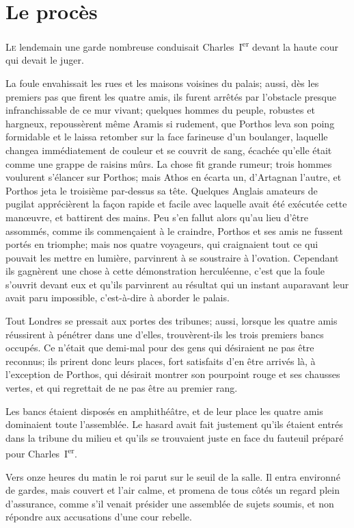 \chapter{Le procès}

\lettrine{L}{e} lendemain une garde nombreuse conduisait Charles~I\textsuperscript{er} devant la haute cour qui devait le juger.

\zz
La foule envahissait les rues et les maisons voisines du palais; aussi, dès les premiers pas que firent les quatre amis, ils furent arrêtés par l'obstacle presque infranchissable de ce mur vivant; quelques hommes du peuple, robustes et hargneux, repoussèrent même Aramis si rudement, que Porthos leva son poing formidable et le laissa retomber sur la face farineuse d'un boulanger, laquelle changea immédiatement de couleur et se couvrit de sang, écachée qu'elle était comme une grappe de raisins mûrs. La chose fit grande rumeur; trois hommes voulurent s'élancer sur Porthos; mais Athos en écarta un, d'Artagnan l'autre, et Porthos jeta le troisième par-dessus sa tête. Quelques Anglais amateurs de pugilat apprécièrent la façon rapide et facile avec laquelle avait été exécutée cette manœuvre, et battirent des mains. Peu s'en fallut alors qu'au lieu d'être assommés, comme ils commençaient à le craindre, Porthos et ses amis ne fussent portés en triomphe; mais nos quatre voyageurs, qui craignaient tout ce qui pouvait les mettre en lumière, parvinrent à se soustraire à l'ovation. Cependant ils gagnèrent une chose à cette démonstration herculéenne, c'est que la foule s'ouvrit devant eux et qu'ils parvinrent au résultat qui un instant auparavant leur avait paru impossible, c'est-à-dire à aborder le palais.

Tout Londres se pressait aux portes des tribunes; aussi, lorsque les quatre amis réussirent à pénétrer dans une d'elles, trouvèrent-ils les trois premiers bancs occupés. Ce n'était que demi-mal pour des gens qui désiraient ne pas être reconnus; ils prirent donc leurs places, fort satisfaits d'en être arrivés là, à l'exception de Porthos, qui désirait montrer son pourpoint rouge et ses chausses vertes, et qui regrettait de ne pas être au premier rang.

Les bancs étaient disposés en amphithéâtre, et de leur place les quatre amis dominaient toute l'assemblée. Le hasard avait fait justement qu'ils étaient entrés dans la tribune du milieu et qu'ils se trouvaient juste en face du fauteuil préparé pour Charles~I\textsuperscript{er}.

Vers onze heures du matin le roi parut sur le seuil de la salle. Il entra environné de gardes, mais couvert et l'air calme, et promena de tous côtés un regard plein d'assurance, comme s'il venait présider une assemblée de sujets soumis, et non répondre aux accusations d'une cour rebelle.

